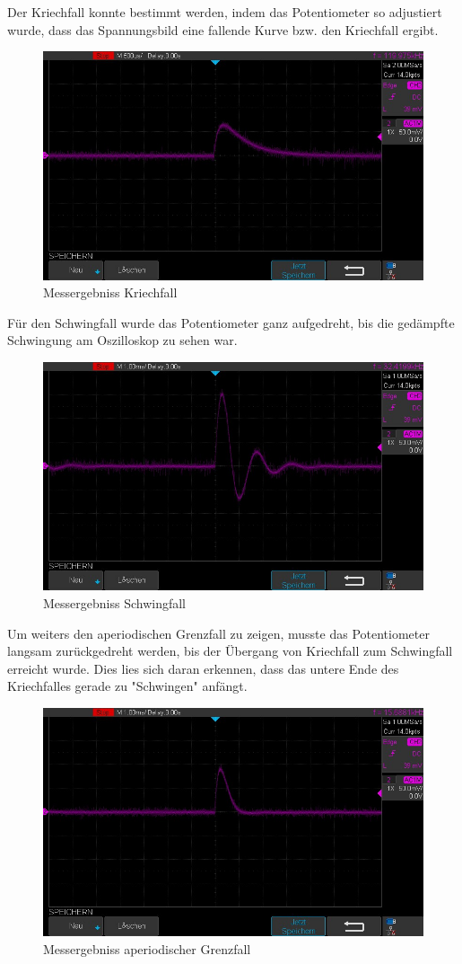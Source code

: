 \documentclass[12pt,a4paper,twoside]{article}
\begin{document}
\noindent
Der Kriechfall konnte bestimmt werden, indem das Potentiometer so adjustiert wurde, dass das Spannungsbild eine fallende Kurve bzw. den Kriechfall ergibt.

\begin{figure}[H]
    \centering
    \includegraphics[width=0.6\linewidth, angle=0]{Messergebnisse/3.3 Kriechfall/KriechfallNahe.jpg}
    \caption{Messergebniss Kriechfall}
    \label{fig:MessergebnissKriechfall}
\end{figure}

\noindent
Für den Schwingfall wurde das Potentiometer ganz aufgedreht, bis die gedämpfte Schwingung am Oszilloskop zu sehen war.

\begin{figure}[H]
    \centering
    \includegraphics[width=0.6\linewidth, angle=0]{Messergebnisse/3.3 Schwingfall/SchwingfallNahe.jpg}
    \caption{Messergebniss Schwingfall}
    \label{fig:MessergebnissSchwingfall}
\end{figure}

\noindent
Um weiters den aperiodischen Grenzfall zu zeigen, musste das Potentiometer langsam zurückgedreht werden, bis der Übergang von Kriechfall zum Schwingfall erreicht wurde.
Dies lies sich daran erkennen, dass das untere Ende des Kriechfalles gerade zu "Schwingen" anfängt.

\begin{figure}[H]
    \centering
    \includegraphics[width=0.6\linewidth, angle=0]{Messergebnisse/3.3 Grenzfall/GrenzfallNahe.jpg}
    \caption{Messergebniss aperiodischer Grenzfall}
    \label{fig:MessergebnissAperiodischerGrenzfall}
\end{figure}
\end{document}
